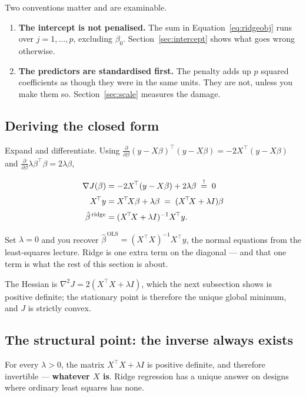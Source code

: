 \documentclass[11pt]{article}
\newcommand{\bhat}{\hat\beta}
\newcommand{\XtX}{X^{\!\top}\!X}
\newcommand{\Xty}{X^{\!\top}y}
\begin{document}
Two conventions matter and are examinable.

\begin{enumerate}[leftmargin=*]
  \item \textbf{The intercept is not penalised.} The sum in
    Equation~\eqref{eq:ridgeobj} runs over $j = 1, \dots, p$, excluding
    $\beta_0$. Section~\ref{sec:intercept} shows what goes wrong otherwise.
  \item \textbf{The predictors are standardised first.} The penalty adds up
    $p$ squared coefficients as though they were in the same units. They are
    not, unless you make them so. Section~\ref{sec:scale} measures the damage.
\end{enumerate}

\subsection{Deriving the closed form}
\label{sec:derive}

Expand and differentiate. Using
$\frac{\partial}{\partial\beta}(y - X\beta)^{\!\top}(y - X\beta)
= -2X^{\!\top}(y - X\beta)$ and
$\frac{\partial}{\partial\beta}\lambda\beta^{\!\top}\beta = 2\lambda\beta$,

\begin{align}
  \nabla J(\beta) &= -2X^{\!\top}(y - X\beta) + 2\lambda\beta
    \;\stackrel{!}{=}\; 0 \notag\\[2pt]
  \Xty &= \XtX\beta + \lambda\beta \;=\; (\XtX + \lambda I)\beta \notag\\[2pt]
  \bhat^{\,\mathrm{ridge}} &= (\XtX + \lambda I)^{-1}\Xty .
  \label{eq:ridge}
\end{align}

Set $\lambda = 0$ and you recover $\bhat^{\,\mathrm{OLS}} = (\XtX)^{-1}\Xty$,
the normal equations from the least-squares lecture. Ridge is one extra term
on the diagonal --- and that one term is what the rest of this section is
about.

The Hessian is $\nabla^2 J = 2(\XtX + \lambda I)$, which the next subsection
shows is positive definite; the stationary point is therefore the unique
global minimum, and $J$ is strictly convex.

\subsection{The structural point: the inverse always exists}
\label{sec:invert}

\begin{keyidea}
For every $\lambda > 0$, the matrix $\XtX + \lambda I$ is positive definite,
and therefore invertible --- \textbf{whatever $X$ is}. Ridge regression has a
unique answer on designs where ordinary least squares has none.
\end{keyidea}
\end{document}

